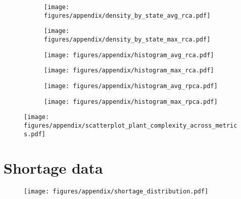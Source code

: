 \begin{figure}
     \centering
     \begin{subfigure}[b]{0.45\textwidth}
         \centering
         \texttt{[image: figures/appendix/density\_by\_state\_avg\_rca.pdf]}
	 \caption{}
         \label{fig:}
     \end{subfigure}
     \hfill
     \begin{subfigure}[b]{0.45\textwidth}
         \centering
         \texttt{[image: figures/appendix/density\_by\_state\_max\_rca.pdf]}
	 \caption{}
         \label{fig:interaction_sample_max}
     \end{subfigure}
     \caption[]{}
        \label{fig:}
\end{figure}

\begin{figure}
     \centering
     \begin{subfigure}[b]{0.45\textwidth}
         \centering
         \texttt{[image: figures/appendix/histogram\_avg\_rca.pdf]}
	 \caption{}
         \label{fig:}
     \end{subfigure}
     \hfill
     \begin{subfigure}[b]{0.45\textwidth}
         \centering
         \texttt{[image: figures/appendix/histogram\_max\_rca.pdf]}
	 \caption{}
         \label{fig:interaction_sample_max}
     \end{subfigure}
     \caption[]{}
        \label{fig:}
\end{figure}

\begin{figure}
     \centering
     \begin{subfigure}[b]{0.45\textwidth}
         \centering
         \texttt{[image: figures/appendix/histogram\_avg\_rpca.pdf]}
	 \caption{}
         \label{fig:}
     \end{subfigure}
     \hfill
     \begin{subfigure}[b]{0.45\textwidth}
         \centering
         \texttt{[image: figures/appendix/histogram\_max\_rpca.pdf]}
	 \caption{}
         \label{fig:interaction_sample_max}
     \end{subfigure}
     \caption[]{}
        \label{fig:}
\end{figure}

\begin{figure}[htpb]
	\centering
	\texttt{[image: figures/appendix/scatterplot\_plant\_complexity\_across\_metrics.pdf]}
	\caption{}%
	\label{fig:}
\end{figure}

\section{Shortage data}

\begin{figure}[htpb]
	\centering
	\texttt{[image: figures/appendix/shortage\_distribution.pdf]}
	\caption{}%
	\label{fig:}
\end{figure}
